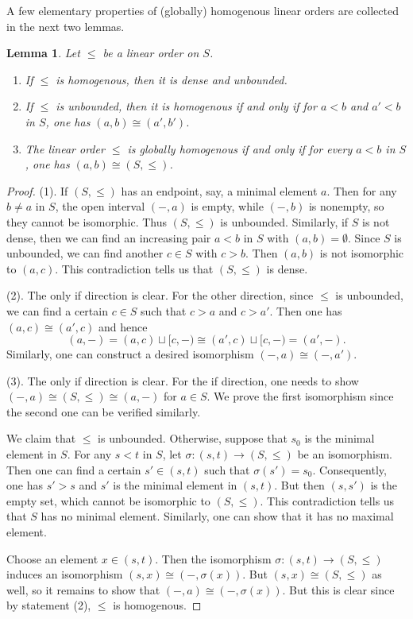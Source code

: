 \documentclass[11pt, reqno]{amsart}
\theoremstyle{plain}
\newtheorem{lemma}[theorem]{Lemma}
\numberwithin{equation}{section}
\theoremstyle{definition}
\begin{document}
A few elementary properties of (globally) homogenous linear orders are collected in the next two lemmas.

\begin{lemma} \label{unbounded and dense}
Let $\leqslant$ be a linear order on $S$.
\begin{enumerate}
\item If $\leqslant$ is homogenous, then it is dense and unbounded.

\item If $\leqslant$ is unbounded, then it is homogenous if and only if for $a < b$ and $a' < b$ in $S$, one has $(a, b) \cong (a', b')$.

\item The linear order $\leqslant$ is globally homogenous if and only if for every $a < b$ in $S$, one has $(a, b) \cong (S, \leqslant)$.
\end{enumerate}
\end{lemma}

\begin{proof}
(1). If $(S, \leqslant)$ has an endpoint, say, a minimal element $a$. Then for any $b \neq a$ in $S$, the open interval $(-, a)$ is empty, while $(-, b)$ is nonempty, so they cannot be isomorphic. Thus $(S, \leqslant)$ is unbounded. Similarly, if $S$ is not dense, then we can find an increasing pair $a < b$ in $S$ with $(a, b) = \emptyset$. Since $S$ is unbounded, we can find another $c \in S$ with $c > b$. Then $(a, b)$ is not isomorphic to $(a, c)$. This contradiction tells us that $(S, \leqslant)$ is dense.

(2). The only if direction is clear. For the other direction, since $\leqslant$ is unbounded, we can find a certain $c \in S$ such that $c > a$ and $c > a'$. Then one has $(a, c) \cong (a', c)$ and hence
\[
(a, -) = (a, c) \sqcup [c, -) \cong (a', c) \sqcup [c, -) = (a', -).
\]
Similarly, one can construct a desired isomorphism $(-, a) \cong (-, a')$.

(3). The only if direction is clear. For the if direction, one needs to show $(-, a) \cong (S, \leqslant) \cong (a, -)$ for $a \in S$. We prove the first isomorphism since the second one can be verified similarly.

We claim that $\leqslant$ is unbounded. Otherwise, suppose that $s_0$ is the minimal element in $S$. For any $s < t$ in $S$, let $\sigma: (s, t) \to (S, \leqslant)$ be an isomorphism. Then one can find a certain $s' \in (s, t)$ such that $\sigma(s') = s_0$. Consequently, one has $s' > s$ and $s'$ is the minimal element in $(s, t)$. But then $(s, s')$ is the empty set, which cannot be isomorphic to $(S, \leqslant)$. This contradiction tells us that $S$ has no minimal element. Similarly, one can show that it has no maximal element.

Choose an element $x \in (s, t)$. Then the isomorphism $\sigma: (s, t) \to (S, \leqslant)$ induces an isomorphism $(s, x) \cong (-, \sigma(x))$. But $(s, x) \cong (S, \leqslant)$ as well, so it remains to show that $(-, a) \cong (-, \sigma(x))$. But this is clear since by statement (2), $\leqslant$ is homogenous.
\end{proof}
\end{document}

